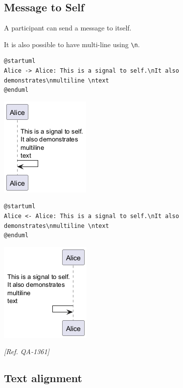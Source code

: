 %
%
\subsection{Message to Self}


A participant can send a message to itself.


It is also possible to have multi-line using \texttt{\textbackslash n}.


\begin{verbatim}
@startuml
Alice -> Alice: This is a signal to self.\nIt also demonstrates\nmultiline \ntext
@enduml
\end{verbatim}
\begin{center}
\includegraphics[scale=0.60]{imgw/img-83e0a2ff75504a63c1db6b286565bf38.png}
\end{center}


\begin{verbatim}
@startuml
Alice <- Alice: This is a signal to self.\nIt also demonstrates\nmultiline \ntext
@enduml
\end{verbatim}
\begin{center}
\includegraphics[scale=0.60]{imgw/img-395f23eec190f589f05ca92c5ba19f8d.png}
\end{center}
\textit{[Ref. QA-1361]}
%
%
\subsection{Text alignment}


